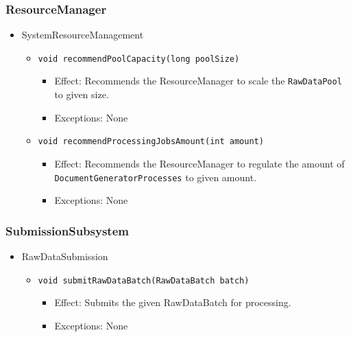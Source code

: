 \documentclass[a4paper,10pt]{article}
\begin{document}
\subsubsection*{ResourceManager}
\begin{itemize}
    \item SystemResourceManagement
    \begin{itemize}
        \item \texttt{void recommendPoolCapacity(long poolSize)}
        \begin{itemize}
            \item Effect: Recommends the ResourceManager to scale the \texttt{RawDataPool} to given size.
            \item Exceptions: None
        \end{itemize}

        \item \texttt{void recommendProcessingJobsAmount(int amount)}
        \begin{itemize}
            \item Effect: Recommends the ResourceManager to regulate the amount of \texttt{DocumentGeneratorProcesses} to given amount.
            \item Exceptions: None
         \end{itemize}
    \end{itemize}
\end{itemize}

\subsubsection*{SubmissionSubsystem}
\begin{itemize}
	\item RawDataSubmission
	\begin{itemize}
		\item \texttt{void submitRawDataBatch(RawDataBatch batch)}
		\begin{itemize}
			\item Effect: Submits the given RawDataBatch for processing.
			\item Exceptions: None
		\end{itemize}
	\end{itemize}
\end{itemize}
\end{document}

